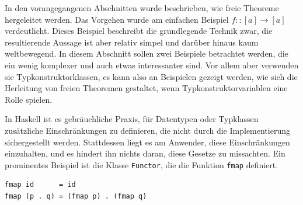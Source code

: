 \label{sec:freie-theoreme-anwendung}


In den vorangegangenen Abschnitten wurde beschrieben, wie freie Theoreme hergeleitet werden. Das Vorgehen wurde am einfachen
Beispiel $f :: [a] \rightarrow [a]$ verdeutlicht. Dieses Beispiel beschreibt die grundlegende Technik zwar, die resultierende
Aussage ist aber relativ simpel und darüber hinaus kaum weltbewegend. 
In diesem Abschnitt sollen zwei Beispiele betrachtet werden, die ein wenig komplexer und auch etwas interessanter sind. Vor
allem aber verwenden sie Typkonstruktorklassen, es kann also an Beispielen gezeigt werden, wie sich die Herleitung
von freien Theoremen gestaltet, wenn Typkonstruktorvariablen eine Rolle spielen.


In Haskell ist es gebräuchliche Praxis, für Datentypen oder Typklassen zusätzliche Einschränkungen zu definieren, die nicht durch
die Implementierung sichergestellt werden. Stattdessen liegt es am Anwender, diese Einschränkungen einzuhalten, und es hindert
ihn nichts daran, diese Gesetze zu missachten. Ein prominentes Beispiel ist die Klasse \texttt{Functor}, die die Funktion
\texttt{fmap} definiert.



\begin{verbatim}
fmap id      = id
fmap (p . q) = (fmap p) . (fmap q)
\end{verbatim}


